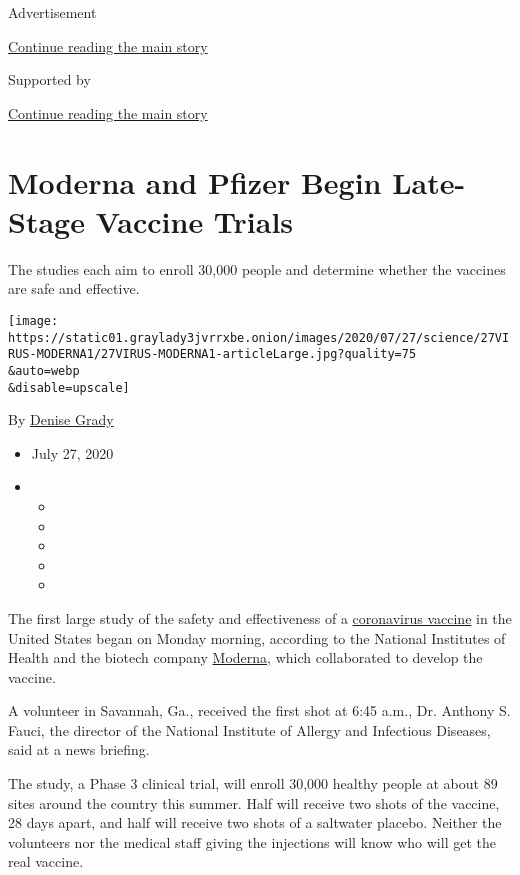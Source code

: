Advertisement

\protect\hyperlink{after-top}{Continue reading the main story}

Supported by

\protect\hyperlink{after-sponsor}{Continue reading the main story}

\hypertarget{moderna-and-pfizer-begin-late-stage-vaccine-trials}{%
\section{Moderna and Pfizer Begin Late-Stage Vaccine
Trials}\label{moderna-and-pfizer-begin-late-stage-vaccine-trials}}

The studies each aim to enroll 30,000 people and determine whether the
vaccines are safe and effective.

\texttt{[image: https://static01.graylady3jvrrxbe.onion/images/2020/07/27/science/27VIRUS-MODERNA1/27VIRUS-MODERNA1-articleLarge.jpg?quality=75\\\&auto=webp\\\&disable=upscale]}

By \href{https://www.nytimes3xbfgragh.onion/by/denise-grady}{Denise
Grady}

\begin{itemize}
\item
  July 27, 2020
\item
  \begin{itemize}
  \item
  \item
  \item
  \item
  \item
  \end{itemize}
\end{itemize}

The first large study of the safety and effectiveness of a
\href{https://www.nytimes3xbfgragh.onion/2020/07/30/health/covid-19-vaccine-monkeys.html}{coronavirus
vaccine} in the United States began on Monday morning, according to the
National Institutes of Health and the biotech company
\href{https://www.nytimes3xbfgragh.onion/2020/07/28/health/coronavirus-moderna-vaccine-monkeys.html}{Moderna},
which collaborated to develop the vaccine.

A volunteer in Savannah, Ga., received the first shot at 6:45 a.m., Dr.
Anthony S. Fauci, the director of the National Institute of Allergy and
Infectious Diseases, said at a news briefing.

The study, a Phase 3 clinical trial, will enroll 30,000 healthy people
at about 89 sites around the country this summer. Half will receive two
shots of the vaccine, 28 days apart, and half will receive two shots of
a saltwater placebo. Neither the volunteers nor the medical staff giving
the injections will know who will get the real vaccine.

